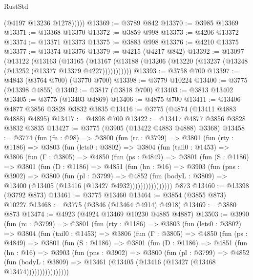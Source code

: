 \begin{lexlean}{RustStd}
\begin{coremodule}
            (@4197 @13236 @1278)))))
@13369 := @3789 @842
@13370 := @3985 @13369
@13371 := @13368 @13370
@13372 := @3859 @998
@13373 := @4206 @13372
@13374 := @13371 @13373
@13375 := @3883 @998
@13376 := @4210 @13375
@13377 := @13374 @13376
@13379 := @4215 (@4217 @842)
@13392 := @13097
    (@13122
      (@13163
        (@13165
          (@13167 (@13188 (@13206 (@13220 (@13237 (@13248 (@13252 (@13377 @13379 @4227)))))))))))
@13393 := @3758 @700
@13397 := @4843 (@3764 @700) (@3770 @700)
@13398 := @3779 @10224
@13400 := @3775 (@13398 @4855)
@13402 := @3817 (@3818 @700)
@13403 := @3813 @13402
@13405 := @3775 (@13403 @4869)
@13406 := @4875 @700
@13411 := @13406 @4877 @3856 @3828 @3832 @3835
@13416 := @3775 (@4874 (@13411 @4883 @4888) @4895)
@13417 := @4898 @700
@13422 := @13417 @4877 @3856 @3828 @3832 @3835
@13427 := @3775 (@3905 (@13422 @4883 @4888) @3368)
@13458 := @3774
    (fun (fn : @98) =>
    @3800
      (fun (rc : @3799) =>
      @3801
        (fun (rty : @1186) =>
        @3803
          (fun (lets0 : @3802) =>
          @3804
            (fun (tail0 : @1453) =>
            @3806
              (fun (Γ : @3805) =>
              @4850
                (fun (ps : @4849) =>
                @3801
                  (fun (S : @1186) =>
                  @3801
                    (fun (D : @1186) =>
                    @4851
                      (fun (hn : @16) =>
                      @3903
                        (fun (pns : @3902) =>
                        @3800
                          (fun (pl : @3799) =>
                          @4852
                            (fun (bodyL : @3809) =>
                            @13400 (@13405 (@13416 (@13427 @4932))))))))))))))))
    @873
@13460 := @13398 (@3792 @873)
@13461 := @3775 @13460
@13464 := @3854 (@3855 @873) @10227
@13468 := @3775 (@3846 (@13464 @4914) @4918)
@13469 := @3880 @873
@13474 := @4923 (@4924 @13469 @10230 @4885 @4887)
@13503 := @3990
    (fun (rc : @3799) =>
    @3801
      (fun (rty : @1186) =>
      @3803
        (fun (lets0 : @3802) =>
        @3804
          (fun (tail0 : @1453) =>
          @3806
            (fun (Γ : @3805) =>
            @4850
              (fun (ps : @4849) =>
              @3801
                (fun (S : @1186) =>
                @3801
                  (fun (D : @1186) =>
                  @4851
                    (fun (hn : @16) =>
                    @3903
                      (fun (pns : @3902) =>
                      @3800
                        (fun (pl : @3799) =>
                        @4852
                          (fun (bodyL : @3809) =>
                          @13461 (@13405 (@13416 (@13427 (@13468 @13474))))))))))))))))

\end{coremodule}
\end{lexlean}
